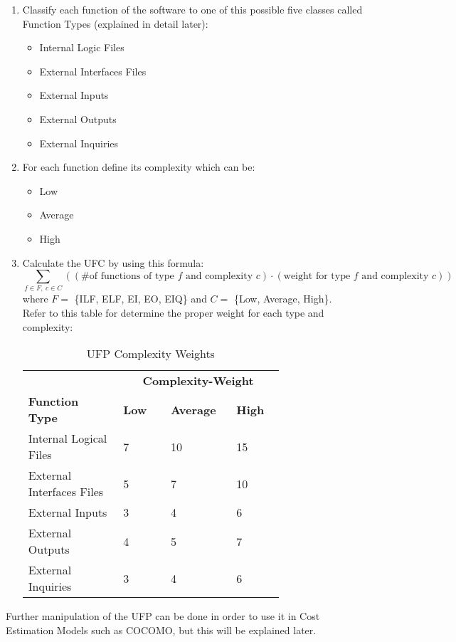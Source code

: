 \begin{enumerate}
	\item Classify each function of the software to one of this possible five classes called Function Types (explained in detail later):
	\begin{itemize}
		\item Internal Logic Files
		\item External Interfaces Files
		\item External Inputs
		\item External Outputs
		\item External Inquiries
	\end{itemize}
	\item For each function define its complexity which can be:
	\begin{itemize}
		\item Low
		\item Average
		\item High
	\end{itemize}
	\item Calculate the UFC by using this formula:
	$$ \sum_{f \in F,\ c \in C} \left((\textrm{\# of functions of type } f \textrm{ and complexity } c) \cdot (\textrm{weight for type } f \textrm{ and complexity } c ) \right) $$
	where $F = $ \{ILF, ELF, EI, EO, EIQ\} and $C = $ \{Low, Average, High\}. \\
	Refer to this table for determine the proper weight for each type and complexity:
	\begin{table}[H]
	\centering
	\begin{tabular}{x{0.3\linewidth}x{0.15\linewidth}x{0.15\linewidth}x{0.15\linewidth}}
		\hline 
		&  \\
		\textbf{Function Type} & \textbf{Low} &\textbf{Average} & \textbf{High} \\
		\hline
		Internal Logical Files & 7 & 10 & 15 \\
		External Interfaces Files & 5 & 7 & 10 \\
		External Inputs & 3 & 4 & 6 \\
		External Outputs & 4 & 5 & 7 \\
		External Inquiries & 3 & 4 & 6 \\
		\hline
	\end{tabular}
	\caption{UFP Complexity Weights}
\end{table}
\end{enumerate}
Further manipulation of the UFP can be done in order to use it in Cost Estimation Models such as COCOMO, but this will be explained later.
